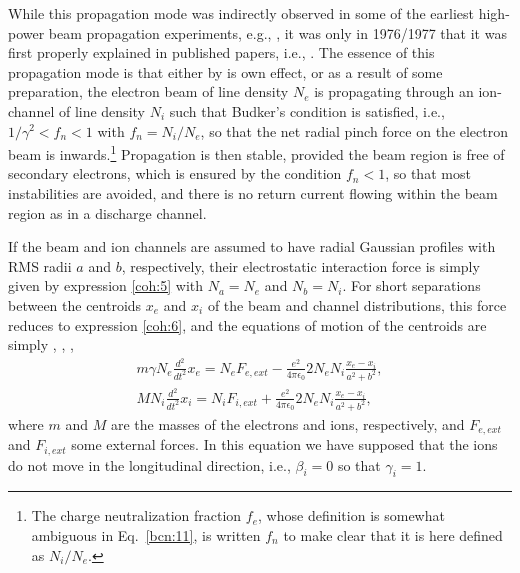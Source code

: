 \documentclass [12pt,a4paper,     ]{report} %
\begin{document}
   While this propagation mode was indirectly observed in some of the earliest high-power beam propagation experiments, e.g., \cite{BEAL-1972-}, it was only in 1976/1977 that it was first properly explained in published papers, i.e., \cite{DIDEN1976A, BRIGG1977-}.  The essence of this propagation mode is that either by is own effect, or as a result of some preparation, the electron beam of line density $N_e$ is propagating through an ion-channel of line density $N_i$ such that Budker's condition is satisfied, i.e., $1/\gamma^2 < f_n < 1$ with $f_n=N_i/N_e$, so that the net radial pinch force on the electron beam is inwards.\footnote{The charge neutralization fraction $f_e$, whose definition is somewhat ambiguous in Eq.~\eqref{bcn:11}, is written $f_n$ to make clear that it is here defined as $N_i/N_e$.}   Propagation is then stable, provided the beam region is free of secondary electrons, which is ensured by the condition $f_n < 1$, so that most instabilities are avoided, and there is no return current flowing within the beam region as in a discharge channel.

   If  the beam and ion channels are assumed to have radial Gaussian profiles with RMS radii $a$ and $b$, respectively, their electrostatic interaction force is simply given by expression \eqref{coh:5} with $N_a=N_e$ and $N_b=N_i$.  For short separations between the centroids $x_e$ and $x_i$ of the beam and channel distributions, this force reduces to expression \eqref{coh:6}, and the equations of motion of the centroids are simply \cite[p.75]{BUDKE1956A}, \cite[p.685]{BUDKE1956B}, \cite[p.232]{FINKE1961-}, \cite[p.226]{BUCHA1987-}
%
\begin{gather}
\label{dgc:3} %
   m \gamma N_e \frac{d^2}{d t^2} x_e = N_e F_{e,ext}
              - \frac{e^2}{4\pi \epsilon_0} 2 N_e N_i\frac{x_e-x_i}{a^2+b^2},\\
\label{dgc:4} %
   M        N_i \frac{d^2}{d t^2} x_i = N_i F_{i,ext}
              + \frac{e^2}{4\pi \epsilon_0} 2 N_e N_i\frac{x_e-x_i}{a^2+b^2},
\end{gather}
%
where $m$ and $M$ are the masses of the electrons and ions, respectively, and $F_{e,ext}$ and $F_{i,ext}$ some external forces.  In this equation we have supposed that the ions do not move in the longitudinal direction, i.e., $\beta_i =0$ so that $\gamma_i =1$.
\end{document}
